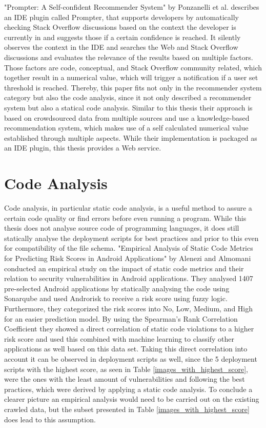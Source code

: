 "Prompter: A Self-confident Recommender System" \cite{6976143} by Ponzanelli et al. describes an IDE plugin called Prompter, that supports developers by automatically checking Stack Overflow discussions based on the context the developer is currently in and suggests those if a certain confidence is reached. It silently observes the context in the IDE and searches the Web and Stack Overflow discussions and evaluates the relevance of the results based on multiple factors. Those factors are code, conceptual, and Stack Overflow community related, which together result in a numerical value, which will trigger a notification if a user set threshold is reached. Thereby, this paper fits not only in the recommender system category but also the code analysis, since it not only described a recommender system but also a statical code analysis. Similar to this thesis their approach is based on crowdsourced data from multiple sources and use a knowledge-based recommendation system, which makes use of a self calculated numerical value established through multiple aspects. While their implementation is packaged as an IDE plugin, this thesis provides a Web service.

\section{Code Analysis}
\label{sec:codeAnalysis}
Code analysis, in particular static code analysis, is a useful method to assure a certain code quality or find errors before even running a program. While this thesis does not analyse source code of programming languages, it does still statically analyse the deployment scripts for best practices and prior to this even for compatibility of the file schema.
"Empirical Analysis of Static Code Metrics for Predicting Risk Scores in Android Applications" \cite{androidAlenezi} by Alenezi and Almomani conducted an empirical study on the impact of static code metrics and their relation to security vulnerabilities in Android applications. They analysed 1407 pre-selected Android applications by statically analysing the code using Sonarqube and used Androrisk to receive a risk score using fuzzy logic. Furthermore, they categorized the risk scores into No, Low, Medium, and High for an easier prediction model. By using the Spearman's Rank Correlation Coefficient they showed a direct correlation of static code violations to a higher risk score and used this combined with machine learning to classify other applications as well based on this data set. Taking this direct correlation into account it can be observed in deployment scripts as well, since the 5 deployment scripts with the highest score, as seen in Table \ref{images_with_highest_score}, were the ones with the least amount of vulnerabilities and following the best practices, which were derived by applying a static code analysis. To conclude a clearer picture an empirical analysis would need to be carried out on the existing crawled data, but the subset presented in Table \ref{images_with_highest_score} does lead to this assumption.

